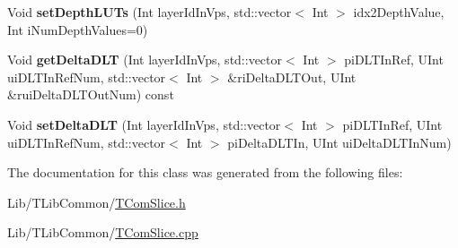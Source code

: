 {\bf }\par
\begin{DoxyCompactItemize}
\item 
\mbox{\label{class_t_com_d_l_t_a17c692eb97ff15e20c7464bb346d8af5}} 
Void {\bfseries set\+Depth\+L\+U\+Ts} (Int layer\+Id\+In\+Vps, std\+::vector$<$ Int $>$ idx2\+Depth\+Value, Int i\+Num\+Depth\+Values=0)
\item 
\mbox{\label{class_t_com_d_l_t_ad0878fdecc20abf897497a2622802baf}} 
Void {\bfseries get\+Delta\+D\+LT} (Int layer\+Id\+In\+Vps, std\+::vector$<$ Int $>$ pi\+D\+L\+T\+In\+Ref, U\+Int ui\+D\+L\+T\+In\+Ref\+Num, std\+::vector$<$ Int $>$ \&ri\+Delta\+D\+L\+T\+Out, U\+Int \&rui\+Delta\+D\+L\+T\+Out\+Num) const
\item 
\mbox{\label{class_t_com_d_l_t_a764c4a31b60c7a50e7bfc659229fda3d}} 
Void {\bfseries set\+Delta\+D\+LT} (Int layer\+Id\+In\+Vps, std\+::vector$<$ Int $>$ pi\+D\+L\+T\+In\+Ref, U\+Int ui\+D\+L\+T\+In\+Ref\+Num, std\+::vector$<$ Int $>$ pi\+Delta\+D\+L\+T\+In, U\+Int ui\+Delta\+D\+L\+T\+In\+Num)
\end{DoxyCompactItemize}



The documentation for this class was generated from the following files\+:\begin{DoxyCompactItemize}
\item 
Lib/\+T\+Lib\+Common/\hyperlink{_t_com_slice_8h}{T\+Com\+Slice.\+h}\item 
Lib/\+T\+Lib\+Common/\hyperlink{_t_com_slice_8cpp}{T\+Com\+Slice.\+cpp}\end{DoxyCompactItemize}
